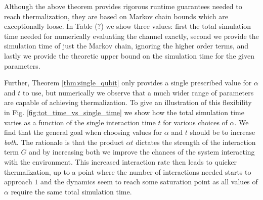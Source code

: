 \documentclass{article}
\begin{document}
 Although the above theorem provides rigorous runtime guarantees needed to reach thermalization, they are based on Markov chain bounds which are exceptionally loose. In Table (?) we show three values: first the total simulation time needed for numerically evaluating the channel exactly, second we provide the simulation time of just the Markov chain, ignoring the higher order terms, and lastly we provide the theoretic upper bound on the simulation time for the given parameters. 
 
 Further, Theorem \ref{thm:single_qubit} only provides a single prescribed value for $\alpha$ and $t$ to use, but numerically we observe that a much wider range of parameters are capable of achieving thermalization. To give an illustration of this flexibility in Fig. \ref{fig:tot_time_vs_single_time} we show how the total simulation time varies as a function of the single interaction time $t$ for various choices of $\alpha$. We find that the general goal when choosing values for $\alpha$ and $t$ should be to increase \emph{both}. The rationale is that the product $\alpha t$ dictates the strength of the interaction term $G$ and by increasing both we improve the chances of the system interacting with the environment. This increased interaction rate then leads to quicker thermalization, up to a point where the number of interactions needed starts to approach $1$ and the dynamics seem to reach some saturation point as all values of $\alpha$ require the same total simulation time.
\end{document}
